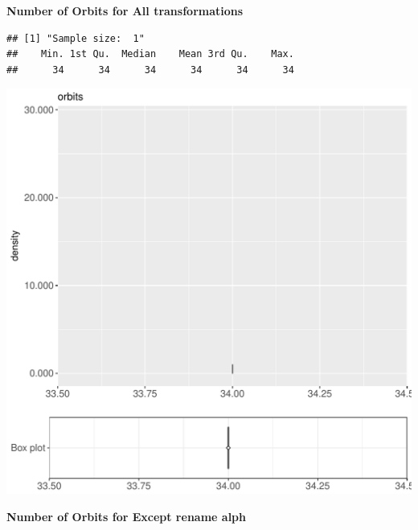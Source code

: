 \documentclass{article}\usepackage[]{graphicx}\usepackage[]{color}
\makeatletter
\def\maxwidth{ %
  \ifdim\Gin@nat@width>\linewidth
    \linewidth
  \else
    \Gin@nat@width
  \fi
}
\newenvironment{kframe}{%
 \def\at@end@of@kframe{}%
 \ifinner\ifhmode%
  \def\at@end@of@kframe{\end{minipage}}%
  \begin{minipage}{\columnwidth}%
 \fi\fi%
 \def\FrameCommand##1{\hskip\@totalleftmargin \hskip-\fboxsep
 \colorbox{shadecolor}{##1}\hskip-\fboxsep
     \hskip-\linewidth \hskip-\@totalleftmargin \hskip\columnwidth}%
 \MakeFramed {\advance\hsize-\width
   \@totalleftmargin\z@ \linewidth\hsize
   \@setminipage}}%
 {\par\unskip\endMakeFramed%
 \at@end@of@kframe}
\newenvironment{knitrout}{}{} %
\makeatother
\begin{document}
 \textbf{Number of Orbits for All transformations}
\begin{knitrout}
\color{fgcolor}\begin{kframe}
\begin{verbatim}
## [1] "Sample size:  1"
##    Min. 1st Qu.  Median    Mean 3rd Qu.    Max. 
##      34      34      34      34      34      34
\end{verbatim}


{\ttfamily\noindent\bfseries{}}\end{kframe}
\includegraphics[width=\maxwidth]{figure/RH8_cashew_big-1} 

\end{knitrout}
 \textbf{Number of Orbits for Except rename alph}
\end{document}

